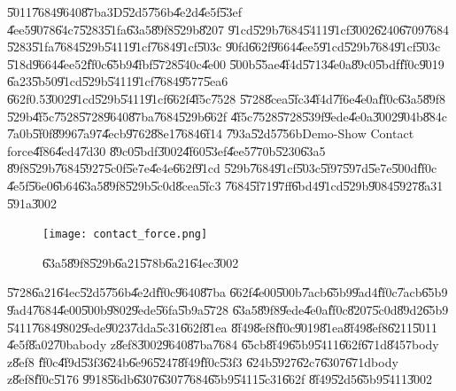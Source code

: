 \U{5011}\U{7684}\U{9640}\U{87ba}3D\U{52d5}\U{756b}\U{4e2d}\U{4e5f}\U{53ef}%
\U{4ee5}\U{9078}\U{64c7}\U{5283}\U{51fa}\U{63a5}\U{89f8}\U{529b}\U{8207}%
\U{91cd}\U{529b}\U{7684}\U{5411}\U{91cf}\U{3002}\U{6240}\U{6709}\U{7684}%
\U{5283}\U{51fa}\U{7684}\U{529b}\U{5411}\U{91cf}\U{7684}\U{91cf}\U{503c}%
\U{90fd}\U{662f}\U{9664}\U{4ee5}\U{91cd}\U{529b}\U{7684}\U{91cf}\U{503c}%
\U{518d}\U{9664}\U{4ee5}2\U{ff0c}\U{65b9}\U{4fbf}\U{5728}\U{540c}\U{4e00}%
\U{500b}\U{55ae}\U{4f4d}\U{5713}\U{4e0a}\U{89c0}\U{5bdf}\U{ff0c}\U{9019}%
\U{6a23}\U{5b50}\U{91cd}\U{529b}\U{5411}\U{91cf}\U{7684}\U{9577}\U{5ea6}%
\U{662f}0.5\U{3002}\U{91cd}\U{529b}\U{5411}\U{91cf}\U{662f}\U{4f5c}\U{7528}%
\U{5728}\U{8cea}\U{5fc3}\U{4f4d}\U{7f6e}\U{4e0a}\U{ff0c}\U{63a5}\U{89f8}%
\U{529b}\U{4f5c}\U{7528}\U{5728}\U{9640}\U{87ba}\U{7684}\U{529b}\U{662f}%
\U{4f5c}\U{7528}\U{5728}\U{539f}\U{9ede}\U{4e0a}\U{3002}\U{904b}\U{884c}%
\U{7a0b}\U{5f0f}\U{8996}\U{7a97}\U{4ecb}\U{9762}\U{88e1}\U{7684}\U{6f14}%
\U{793a}\U{52d5}\U{756b}Demo-Show Contact force\U{4f86}\U{4ed4}\U{7d30}%
\U{89c0}\U{5bdf}\U{3002}\U{4f60}\U{53ef}\U{4ee5}\U{770b}\U{5230}\U{63a5}%
\U{89f8}\U{529b}\U{7684}\U{5927}\U{5c0f}\U{5e7e}\U{4e4e}\U{662f}\U{91cd}%
\U{529b}\U{7684}\U{91cf}\U{503c}\U{5f97}\U{597d}\U{5e7e}\U{500d}\U{ff0c}%
\U{4e5f}\U{56e0}\U{6b64}\U{63a5}\U{89f8}\U{529b}\U{5c0d}\U{8cea}\U{5fc3}%
\U{7684}\U{5f71}\U{97ff}\U{6bd4}\U{91cd}\U{529b}\U{9084}\U{5927}\U{8a31}%
\U{591a}\U{3002}

\begin{figure}[th]
\caption{\U{63a5}\U{89f8}\U{529b}\U{6a21}\U{578b}\U{6a21}\U{64ec}\U{3002}}
\begin{center}
\texttt{[image: contact\_force.png]}
\end{center}
\end{figure}

\bigskip

\U{5728}\U{6a21}\U{64ec}\U{52d5}\U{756b}\U{4e2d}\U{ff0c}\U{9640}\U{87ba}%
\U{662f}\U{4e00}\U{500b}\U{7acb}\U{65b9}\U{9ad4}\U{ff0c}\U{7acb}\U{65b9}%
\U{9ad4}\U{7684}\U{4e00}\U{500b}\U{9802}\U{9ede}\U{56fa}\U{5b9a}\U{5728}%
\U{63a5}\U{89f8}\U{9ede}\U{4e0a}\U{ff0c}\U{8207}\U{5c0d}\U{89d2}\U{65b9}%
\U{5411}\U{7684}\U{9802}\U{9ede}\U{9023}\U{7dda}\U{5c31}\U{662f}\U{81ea}%
\U{8f49}\U{8ef8}\U{ff0c}\U{9019}\U{81ea}\U{8f49}\U{8ef8}\U{6211}\U{5011}%
\U{4e5f}\U{8a02}\U{70ba}body z\U{8ef8}\U{3002}\U{9640}\U{87ba}\U{7684}%
\U{65cb}\U{8f49}\U{65b9}\U{5411}\U{662f}\U{671d}\U{8457}body z\U{8ef8}%
\U{ff0c}\U{4f9d}\U{53f3}\U{624b}\U{6e96}\U{5247}\U{8f49}\U{ff0c}\U{53f3}%
\U{624b}\U{5927}\U{62c7}\U{6307}\U{671d}body z\U{8ef8}\U{ff0c}\U{5176}%
\U{9918}\U{56db}\U{6307}\U{6307}\U{7684}\U{65b9}\U{5411}\U{5c31}\U{662f}%
\U{8f49}\U{52d5}\U{65b9}\U{5411}\U{3002}

